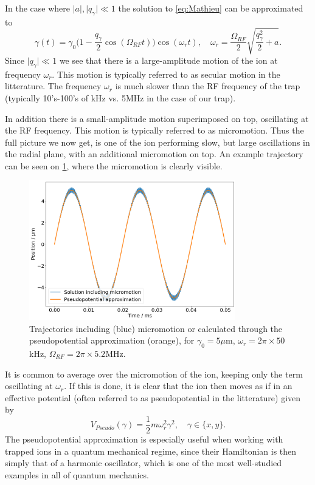 In the case where $\vert a\vert,\vert q_\gamma\vert\ll 1$ the solution to \cref{eq:Mathieu} can be approximated to
\begin{equation}
    \label{eq:omega_r}
    \gamma(t) = \gamma_0\bigg(1-\frac{q_\gamma}{2}\cos{(\Omega_{RF}t)}\bigg)\cos{(\omega_r t)},\quad \omega_r = \frac{\Omega_{RF}}{2}\sqrt{\frac{q_\gamma^2}{2}+a}.
\end{equation}
Since $\vert q_\gamma\vert\ll 1$ we see that there is a large-amplitude motion of the ion at frequency $\omega_r$. This motion is typically referred to as secular motion in the litterature. The frequency $\omega_r$ is much slower than the RF frequency of the trap (typically 10's-100's of kHz vs. 5MHz in the case of our trap). 

In addition there is a small-amplitude motion superimposed on top, oscillating at the RF frequency. This motion is typically referred to as micromotion. Thus the full picture we now get, is one of the ion performing slow, but large oscillations in the radial plane, with an additional micromotion on top. An example trajectory can be seen on \cref{fig:micromotion}, where the micromotion is clearly visible.



\begin{figure}
    \centering
    \includegraphics[width = 0.8\textwidth]{main/Micromotion.png}
    \caption{Trajectories including (blue) micromotion or calculated through the pseudopotential approximation (orange), for $\gamma_0 = 5 {\mu}$m, $\omega_r = 2\pi\times 50$kHz, $\Omega_{RF} = 2\pi\times 5.2$MHz.}
    \label{fig:micromotion}
\end{figure}

It is common to average over the micromotion of the ion, keeping only the term oscillating at $\omega_r$. If this is done, it is clear that the ion then moves as if in an effective potential (often referred to as pseudopotential in the litterature) given by
\begin{equation}
    V_{Pseudo}(\gamma) = \frac{1}{2}m\omega_r^2\gamma^2,\quad \gamma\in\{x,y\}.
\end{equation}
The pseudopotential approximation is especially useful when working with trapped ions in a quantum mechanical regime, since their Hamiltonian is then simply that of a harmonic oscillator, which is one of the most well-studied examples in all of quantum mechanics.
